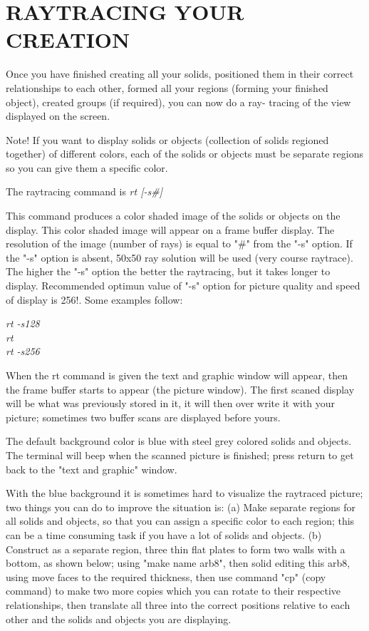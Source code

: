 \chapter{RAYTRACING YOUR CREATION}

Once you have finished creating all your solids, positioned them in
their correct relationships to each other, formed all your regions (forming
your finished object), created groups (if required), you can now do a ray-
tracing of the view displayed on the screen.

Note!  If you want to display solids or objects (collection of solids
regioned together) of different colors, each of the solids or objects must be
separate regions so you can give them a specific color.

The raytracing command is
{\em\center
  rt [-s\#]
}

This command produces a color shaded image of the solids or objects on
the display.  This color shaded image  will appear on a frame buffer display.
The resolution of the image (number of rays) is equal to "\#" from the "-s"
option.  If the "-s" option is absent, 50x50 ray solution will be used (very
course raytrace).  The higher the "-s" option the better the raytracing, but
it takes longer to display.
Recommended optimun value of "-s" option for picture
quality and speed of display is 256!.  Some examples follow:

{\em
             rt -s128 \\
             rt \\
             rt -s256 \\
}

When the rt command is given the text and graphic window will appear,
then the frame buffer starts to appear (the picture window).  The first scaned
display will be what was previously stored in it, it will then over write it
with your picture; sometimes two buffer scans are displayed before yours.

The default background color is blue with steel grey colored solids and
objects.  The terminal will beep when the scanned picture is finished; press
return to get back to the "text and graphic" window.

With the blue background it is sometimes hard to visualize the raytraced
picture; two things you can do to improve the situation is:
     (a)  Make separate regions for all solids and objects, so that you can
assign a specific color to each region; this can be a time consuming task if
you have a lot of solids and objects.
     (b)  Construct as a separate region, three thin flat plates to form two
walls with a bottom, as shown below; using "make name arb8",
then solid editing this arb8, using move faces to the required thickness,
then use command "cp"
(copy command) to make two more copies which you can rotate to their
respective relationships, then translate all three into the correct positions
relative to each other and the solids and objects you are displaying.

